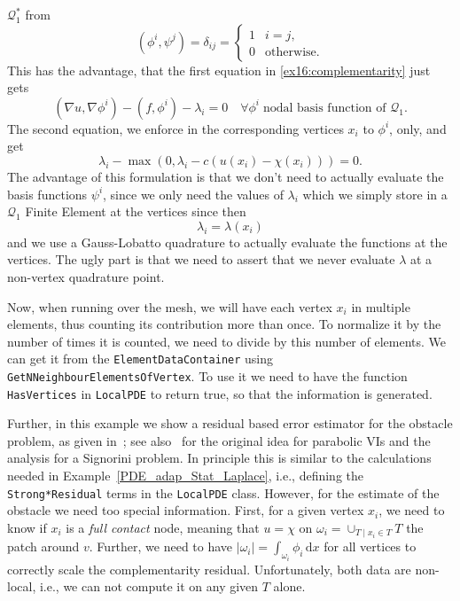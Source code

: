 $\mathcal Q_1^*$ from
\[
 (\phi^i,\psi^j) = \delta_{ij} = \begin{cases} 1 & i = j,\\ 0 &
   \text{otherwise.}
 \end{cases}
\] 
This has the advantage, that
the first equation in \eqref{ex16:complementarity} just gets
\[
  (\nabla u, \nabla \phi^i) - (f,\phi^i) - \lambda_i = 0 \quad \forall
    \phi^i \;\text{nodal basis function of $\mathcal Q_1$.}
\]
The second equation, we enforce in the corresponding vertices $x_i$ to
$\phi^i$, only, and get
\[
    \lambda_i - \max(0,\lambda_i-c(u(x_i)-\chi(x_i))) = 0.
\]
 The advantage of this formulation is that we don't need to actually
 evaluate the basis functions $\psi^i$, since we only need the values
 of $\lambda_i$ which we simply store in a $\mathcal Q_1$
 Finite Element at the vertices since then
 \[
   \lambda_i = \lambda(x_i) 
 \]
 and we use a Gauss-Lobatto quadrature to actually evaluate the
 functions at the vertices. The ugly part is that we need to assert
 that we never evaluate $\lambda$ at a non-vertex quadrature point.

 Now, when running over the mesh, we will have each vertex $x_i$ in
 multiple elements, thus counting its contribution more than once.
 To normalize it by the number of times it is counted, we need to
 divide by this number of elements. We can get it from the
 \texttt{ElementDataContainer} using
 \texttt{GetNNeighbourElementsOfVertex}.
 To use it we need to have the function \texttt{HasVertices} in
 \texttt{LocalPDE} to return true, so that the information is generated.

 Further, in this example we show a residual based error estimator
 for the obstacle problem, as given in~\cite{Walloth:2017}; see
 also~\cite{MoonNochettoPetersdorffZhang:2007,KrauseVeeserWalloth:2015} for the original idea for parabolic VIs and the analysis
 for a Signorini problem. In
 principle this is similar to the calculations needed in
 Example~\ref{PDE_adap_Stat_Laplace}, i.e., defining the
 \texttt{Strong*Residual} terms in the \texttt{LocalPDE} class.
 However, for the estimate of the obstacle we need too special
 information. First, for a given vertex $x_i$, we need to know if
 $x_i$ is a \textit{full contact} node, meaning that $u = \chi$ on
 $\omega_i = \cup_{T \mid x_i \in T} T$ the patch around $v$. Further,
 we need to have $|\omega_i| = \int_{\omega_i} \phi_i\,\mathrm{d}x$ for all
 vertices to correctly scale the complementarity residual.
 Unfortunately, both data are non-local, i.e., we can not compute it
 on any given $T$ alone.

